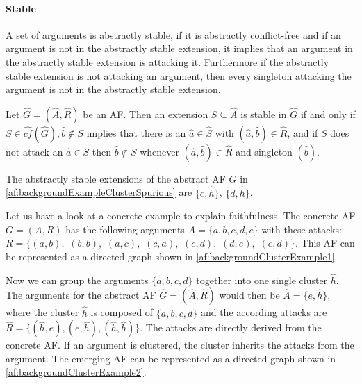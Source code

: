 \paragraph{Stable} A set of arguments is abstractly stable, if it is abstractly conflict-free and if an argument is not in the abstractly stable extension, it implies that an argument in the abstractly stable extension is attacking it. Furthermore if the abstractly stable extension is not attacking an argument, then every singleton attacking the argument is not in the abstractly stable extension.

\begin{definition}
    Let $\hat{G}=(\hat{A},\hat{R})$ be an AF. Then an extension $S \subseteq \hat{A}$ is stable in $\hat{G}$ if and only if $S \in \hat{cf}(\hat{G}), \hat{b} \not\in S$ implies that there is an $\hat{a} \in \hat{S}$ with $(\hat{a}, \hat{b}) \in \hat{R}$, and if $S$ does not attack an $\hat{a} \in S$ then $\hat{b} \not\in S$ whenever $(\hat{a}, \hat{b}) \in \hat{R}$ and singleton $(\hat{b})$.
\end{definition}


\begin{example}
    The abstractly stable extensions of the abstract AF $G$ in \cref{af:backgroundExampleClusterSpurious} are
    $\{e, \hat{h}\}$,
$\{d, \hat{h}\}$.
\end{example}


Let us have a look at a concrete example to explain faithfulness. The concrete AF $G=(A, R)$ has the following arguments $A=\{a, b, c, d, e\}$ with these attacks:
$R=\bigl\{(a,b),$
$(b,b),$
$(a,c),$
$(c,a),$
$(c,d),$
$(d,e),$
$(e,d)\bigl\}$. This AF can be represented as a directed graph shown in \cref{af:backgroundClusterExample1}.

Now we can group the arguments $\{a, b, c, d\}$ together into one single cluster $\hat{h}$. The arguments for the abstract AF $\hat{G}=(\hat{A}, \hat{R})$ would then be $\hat{A}=\{e, \hat{h}\}$, where the cluster $\hat{h}$ is composed of $\{a, b, c, d\}$ and the according attacks are
$\hat{R}=\bigl\{(\hat{h}, e), (e, \hat{h}), (\hat{h}, \hat{h})\bigl\}$. The attacks are directly derived from the concrete AF. If an argument is clustered, the cluster inherits the attacks from the argument. The emerging AF can be represented as a directed graph shown in \cref{af:backgroundClusterExample2}.


